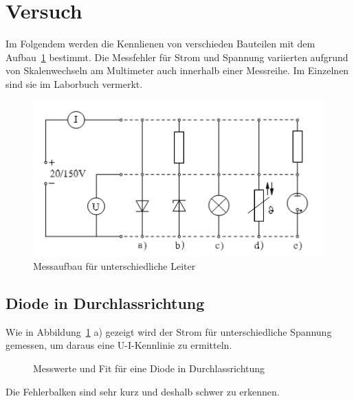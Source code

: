 \section{Versuch}
Im Folgendem werden die Kennlienen von verschieden Bauteilen mit dem Aufbau~\ref{fig:aufbau} bestimmt. Die Messfehler für Strom und Spannung variierten aufgrund von Skalenwechseln am Multimeter auch innerhalb einer Messreihe. Im Einzelnen sind sie im Laborbuch vermerkt.
\begin{figure}[H]
	\centering
	\includegraphics[width=.8\textwidth]{Aufbau.png}
	\caption{Messaufbau für unterschiedliche Leiter}
	\label{fig:aufbau}
\end{figure}
\subsection{Diode in Durchlassrichtung}
Wie in Abbildung~\ref{fig:aufbau} a) gezeigt wird der Strom für unterschiedliche Spannung gemessen, um daraus eine U-I-Kennlinie zu ermitteln.

\begin{figure}[H]
\centering
{}
\caption{Messwerte und Fit für eine Diode in Durchlassrichtung}
\label{fig:diode}
\end{figure}
Die Fehlerbalken sind sehr kurz und deshalb schwer zu erkennen.

